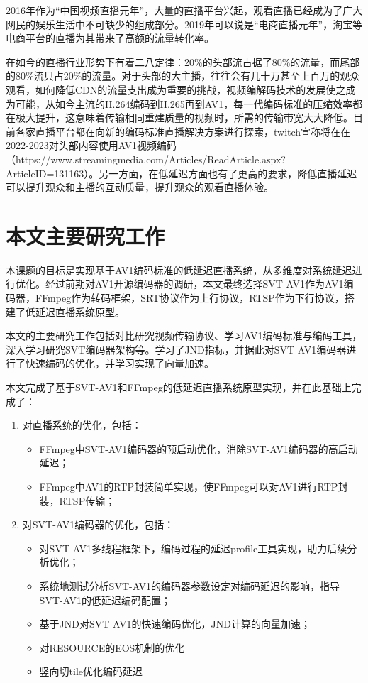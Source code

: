 2016年作为“中国视频直播元年”，大量的直播平台兴起，观看直播已经成为了广大网民的娱乐生活中不可缺少的组成部分。2019年可以说是“电商直播元年”，淘宝等电商平台的直播为其带来了高额的流量转化率。

在如今的直播行业形势下有着二八定律：20\%的头部流占据了80\%的流量，而尾部的80\%流只占20\%的流量。对于头部的大主播，往往会有几十万甚至上百万的观众观看，如何降低CDN的流量支出成为重要的挑战，视频编解码技术的发展使之成为可能，从如今主流的H.264编码到H.265再到AV1，每一代编码标准的压缩效率都在极大提升，这意味着传输相同重建质量的视频时，所需的传输带宽大大降低。目前各家直播平台都在向新的编码标准直播解决方案进行探索，twitch宣称将在在2022-2023对头部内容使用AV1视频编码（https://www.streamingmedia.com/Articles/ReadArticle.aspx?ArticleID=131163）。另一方面，在低延迟方面也有了更高的要求，降低直播延迟可以提升观众和主播的互动质量，提升观众的观看直播体验。

\section{本文主要研究工作}


本课题的目标是实现基于AV1编码标准的低延迟直播系统，从多维度对系统延迟进行优化。经过前期对AV1开源编码器的调研，本文最终选择SVT-AV1作为AV1编码器，FFmpeg作为转码框架，SRT协议作为上行协议，RTSP作为下行协议，搭建了低延迟直播系统原型。

本文的主要研究工作包括对比研究视频传输协议、学习AV1编码标准与编码工具，深入学习研究SVT编码器架构等。学习了JND指标，并据此对SVT-AV1编码器进行了快速编码的优化，并学习实现了向量加速。

本文完成了基于SVT-AV1和FFmpeg的低延迟直播系统原型实现，并在此基础上完成了：
\begin{enumerate} [label=\arabic*)]
    \item 对直播系统的优化，包括：
        \begin{itemize}
            \item FFmpeg中SVT-AV1编码器的预启动优化，消除SVT-AV1编码器的高启动延迟；
            \item FFmpeg中AV1的RTP封装简单实现，使FFmpeg可以对AV1进行RTP封装，RTSP传输；
        \end{itemize}
    \item 对SVT-AV1编码器的优化，包括：
        \begin{itemize}
            \item 对SVT-AV1多线程框架下，编码过程的延迟profile工具实现，助力后续分析优化；
            \item 系统地测试分析SVT-AV1的编码器参数设定对编码延迟的影响，指导SVT-AV1的低延迟编码配置；
            \item 基于JND对SVT-AV1的快速编码优化，JND计算的向量加速；
            \item 对RESOURCE的EOS机制的优化
            \item 竖向切tile优化编码延迟
        \end{itemize}
\end{enumerate}

